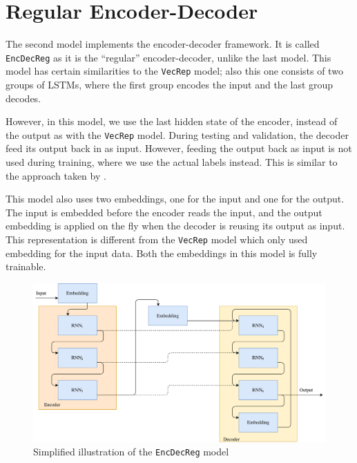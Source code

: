
\section{Regular Encoder-Decoder}
\label{sec:regular_encoder_decoder}
The second model implements the encoder-decoder framework. It is called {\tt EncDecReg} as it is the ``regular'' encoder-decoder, unlike the last model. This model has certain similarities to the {\tt VecRep} model; also this one consists of two groups of LSTMs, where the first group encodes the input and the last group decodes.

However, in this model, we use the last hidden state of the encoder, instead of the output as with the {\tt VecRep} model. During testing and validation, the decoder feed its output back in as input. However, feeding the output back as input is not used during training, where we use the actual labels instead. This is similar to the approach taken by \cite{bengio2015scheduled}.

This model also uses two embeddings, one for the input and one for the output. The input is embedded before the encoder reads the input, and the output embedding is applied on the fly when the decoder is reusing its output as input. This representation is different from the {\tt VecRep} model which only used embedding for the input data. Both the embeddings in this model is fully trainable.

\begin{figure}[!ht]
    \centering
    \includegraphics[width=1\textwidth]{fig/models/encdecreg_model.png}
    \caption{Simplified illustration of the {\tt EncDecReg} model}
    \label{fig:encdecreg_model}
\end{figure}

